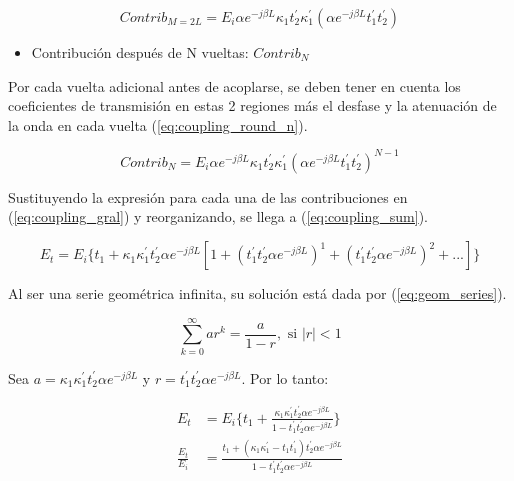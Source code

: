\begin{equation}
Contrib_{M=2L} = E_i \alpha e^{-j \beta L} \kappa_1 t_2^{'} \kappa_1^{'} (\alpha e^{-j \beta L} t_1^{'} t_2^{'})
\label{eq:coupling_round_2}
\end{equation} 

\begin{itemize}
\item Contribución después de N vueltas: $Contrib_N$
\end{itemize} 

Por cada vuelta adicional antes de acoplarse, se deben tener en cuenta los 
coeficientes de transmisión en estas 2 regiones más el desfase y la atenuación de la 
onda en cada vuelta (\ref{eq:coupling_round_n}).

\begin{equation}
Contrib_N = E_i \alpha e^{-j \beta L} \kappa_1 t_2^{'} \kappa_1^{'} (\alpha e^{-j \beta L} t_1^{'} t_2^{'})^{N-1}
\label{eq:coupling_round_n}
\end{equation} 

Sustituyendo la expresión para cada una de las contribuciones en 
(\ref{eq:coupling_gral}) y reorganizando, se llega a (\ref{eq:coupling_sum}).


\begin{equation}
E_t = E_i\{
t_1+
\kappa_1\kappa_1^{'} t_2^{'} \alpha e^{-j \beta L} [
1 +
(t_1^{'} t_2^{'} \alpha e^{-j \beta L})^1 +
(t_1^{'} t_2^{'} \alpha e^{-j \beta L})^2 +
...]\}
\label{eq:coupling_sum}
\end{equation}

Al ser una serie geométrica infinita, su solución está dada por (\ref{eq:geom_series}).

\begin{equation}
\sum\limits_{k = 0}^\infty {ar^{k} = \frac{a}{{1 - r}}}, \text{ si } |r| < 1
\label{eq:geom_series}
\end{equation} 

Sea 
$a = \kappa_1 \kappa_1^{'} t_2^{'} \alpha e^{-j \beta L} $ y  
$r = t_1^{'} t_2^{'} \alpha e^{-j \beta L}$.
Por lo tanto:

\begin{subequations}
\begin{align}
E_t &= E_i\{t_1 + 
\frac{ \kappa_1 \kappa_1^{'} t_2^{'} \alpha e^{-j \beta L}}
{1 - t_1^{'} t_2^{'} \alpha e^{-j \beta L}} \} \\
\frac{E_t}{E_i} &= 
    \frac{t_1 + (\kappa_1 \kappa_1^{'} - t_1 t_1^{'})t_2^{'} \alpha e^{-j \beta L}}
    {1 - t_1^{'} t_2^{'} \alpha e^{-j \beta L}}
\label{eq:t_through}
\end{align} 
\end{subequations}

